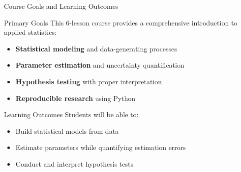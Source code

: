
\begin{frame}{Course Goals and Learning Outcomes}
  \begin{block}{Primary Goals}
    This 6-lesson course provides a comprehensive introduction to applied statistics:
    \begin{itemize}
      \item \textbf{Statistical modeling} and data-generating processes
      \item \textbf{Parameter estimation} and uncertainty quantification
      \item \textbf{Hypothesis testing} with proper interpretation
      \item \textbf{Reproducible research} using Python
    \end{itemize}
  \end{block}

  \begin{block}{Learning Outcomes}
    Students will be able to:
    \begin{itemize}
      \item Build statistical models from data
      \item Estimate parameters while quantifying estimation errors
      \item Conduct and interpret hypothesis tests
    \end{itemize}
  \end{block}
\end{frame}
